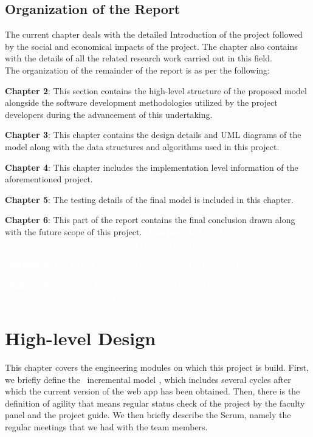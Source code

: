 \documentclass[oneside,12pt]{Classes/VTU}
\begin{document}
   	\section{Organization of the Report}
  	 The current chapter deals with the detailed Introduction of the project followed by the social and economical impacts of the project. The chapter also contains with the details of all the related research work carried out in this field.
  	 \\
  	 The organization of the remainder of the report is as per the following:
  	 \begin{itemize}
  	 	\item \textbf{Chapter 2}: This section contains the high-level structure of the proposed model alongside the software development methodologies utilized by the project developers during the advancement of this undertaking.
  	 	\item \textbf{Chapter 3}: This chapter contains the design details and UML diagrams of the model along with the data structures and algorithms used in this project.
  	 	\item \textbf{Chapter 4}: This chapter includes the implementation level information of the aforementioned project.
  	 	\item \textbf{Chapter 5}: The testing details of the final model is included in this chapter.
  	 	\item \textbf{Chapter 6}: This part of the report contains the final conclusion drawn along with the future scope of this project.
  	 	\
  	 	\tiny\textcolor{white}{\textbf{Chapter 4}: This chapter includes the implementation level information of the aforementioned project.}\normalsize
  	 	\tiny\textcolor{white}{\item \textbf{Chapter 5}: The testing details of the final model is included in this chapter.}\normalsize
  	 	\tiny\textcolor{white}{\textbf{Chapter 6}: This part of the report contains the final conclusion drawn along with the future scope of this project.}\normalsize
  	 \end{itemize}
    
     \chapter{High-level Design}
    
   	This chapter\tiny\textcolor{white}{s}\normalsize covers the engineering modules on which this project\tiny\textcolor{white}{s}\normalsize is build. First, we briefly define the\tiny\textcolor{white}{se}\normalsize incremental model\tiny\textcolor{white}{s}\normalsize, which includes several cycles after which the current version of the web app has been obtained. Then, there is the definition of agility that means regular status check of the project by the faculty panel and the project guide. We then briefly describe the Scrum, namely the regular meetings that we had with the team members.
\end{document}
